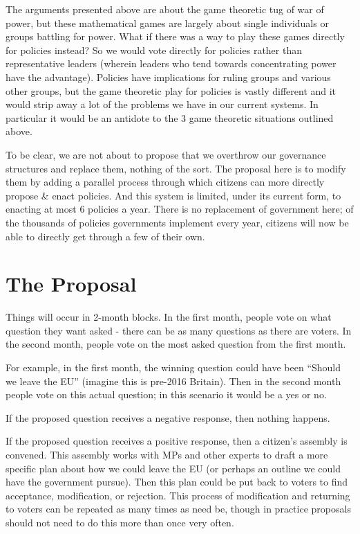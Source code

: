 \documentclass[twoside]{article}
\begin{document}
The arguments presented above are about the game theoretic tug of war of power, but these mathematical games are largely about single individuals or groups battling for power. What if there was a way to play these games directly for policies instead? So we would vote directly for policies rather than representative leaders (wherein leaders who tend towards concentrating power have the advantage). Policies have implications for ruling groups and various other groups, but the game theoretic play for policies is vastly different and it would strip away a lot of the problems we have in our current systems. In particular it would be an antidote to the 3 game theoretic situations outlined above.

To be clear, we are not about to propose that we overthrow our governance structures and replace them, nothing of the sort. The proposal here is to modify them by adding a parallel process through which citizens can more directly propose \& enact policies. And this system is limited, under its current form, to enacting at most 6 policies a year. There is no replacement of government here; of the thousands of policies governments implement every year, citizens will now be able to directly get through a few of their own.

\section{The Proposal}

Things will occur in 2-month blocks. In the first month, people vote on what question they want asked - there can be as many questions as there are voters. In the second month, people vote on the most asked question from the first month.

For example, in the first month, the winning question could have been “Should we leave the EU” (imagine this is pre-2016 Britain). Then in the second month people vote on this actual question; in this scenario it would be a yes or no.

If the proposed question receives a negative response, then nothing happens.

If the proposed question receives a positive response, then a citizen’s assembly is convened. This assembly works with MPs and other experts to draft a more specific plan about how we could leave the EU (or perhaps an outline we could have the government pursue). Then this plan could be put back to voters to find acceptance, modification, or rejection. This process of modification and returning to voters can be repeated as many times as need be, though in practice proposals should not need to do this more than once very often.
\end{document}
